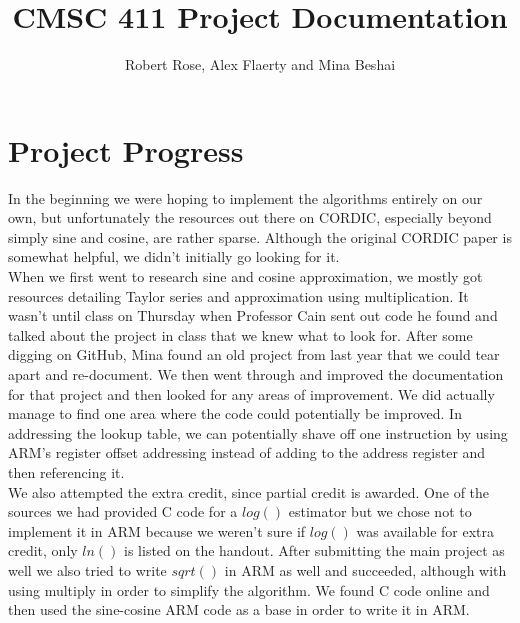 \documentclass[11pt]{article}
\title{CMSC 411 Project Documentation}
\author{Robert Rose, Alex Flaerty and Mina Beshai}
\makeatletter
\let\inserttitle\@title
\let\insertauthor\@author
\makeatother
\begin{document}
\begin{center}
  \LARGE{\inserttitle}

  \Large{\insertauthor}
\end{center}

\section{Project Progress}

In the beginning we were hoping to implement the algorithms entirely on our own, but unfortunately
the resources out there on CORDIC, especially beyond simply sine and cosine, are rather sparse.
Although the original CORDIC paper is somewhat helpful, we didn't initially go looking for
it.\cite{volder1959cordic}\\

When we first went to research sine and cosine approximation, we mostly got resources detailing Taylor
series and approximation using multiplication.\cite{coranac} It wasn't until class on Thursday when
Professor Cain sent out code he found and talked about the project in class that we knew what to
look for.\cite{cainemail} After some digging on GitHub, Mina found an old project from last year that
we could tear apart and re-document.\cite{oldproj} We then went through and improved the documentation
for that project and then looked for any areas of improvement. We did actually manage to find one area
where the code could potentially be improved. In addressing the lookup table, we can potentially shave
off one instruction by using ARM's register offset addressing instead of adding to the address register
and then referencing it.\cite{registeroffsetmanual}\\

We also attempted the extra credit, since partial credit is awarded. One of the sources we had provided
C code for a $log()$ estimator but we chose not to implement it in ARM because we weren't sure if $log()$
was available for extra credit, only $ln()$ is listed on the handout.\cite{efunclog} After submitting the
main project as well we also tried to write $sqrt()$ in ARM as well and succeeded, although with using
multiply in order to simplify the algorithm. We found C code online and then used the sine-cosine ARM code
as a base in order to write it in ARM.\cite{sqrtcordic}
\end{document}
